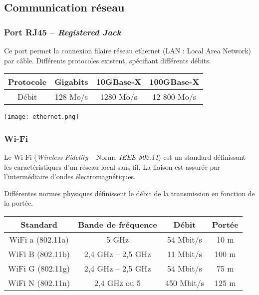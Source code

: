 \subsection{Communication réseau}
\subsubsection{Port RJ45 -- \textit{Registered Jack}}

\begin{minipage}[c]{.7\linewidth}
Ce port permet la connexion filaire réseau ethernet (LAN : Local Area Network) par câble. Différents protocoles existent, spécifiant différents débits.

\begin{center}
\begin{tabular}{|c|c|c|c|}
\hline
Protocole & Gigabits & 10GBase-X & 100GBase-X \\ \hline
Débit & 128 Mo/s & 1280 Mo/s & 12 800 Mo/s\\ \hline
\end{tabular}
\end{center}


\end{minipage}\hfill
\begin{minipage}[c]{.25\linewidth}
\begin{center}
\texttt{[image: ethernet.png]}
\end{center}
\end{minipage}\hfill



\subsubsection{Wi-Fi}

Le Wi-Fi (\textit{Wireless Fidelity} -- Norme \textit{IEEE 802.11}) est un standard définissant les caractéristiques d'un réseau local sans fil. La liaison est assurée par l'intermédiaire d'ondes électromagnétiques.  

Différentes normes physiques définissent le débit de la transmission en fonction de la portée. 
\begin{center}
\begin{tabular}{|c|c|c|c|}
\hline
\textbf{Standard} & \textbf{Bande de fréquence} & \textbf{Débit} & \textbf{Portée} \\ \hline
WiFi a (802.11a) & 5 GHz & 54 Mbit/s & 10 m \\ \hline
WiFi B (802.11b) & 2,4 GHz -- 2,5 GHz& 11 Mbit/s & 100 m \\ \hline
WiFi G (802.11g) & 2,4 GHz -- 2,5 GHz & 54 Mbit/s & 75 m \\ \hline
WiFi N (802.11n) & 2,4 GHz ou 5 & 450 Mbit/s & 125 m \\ \hline
\end{tabular}
\end{center}


